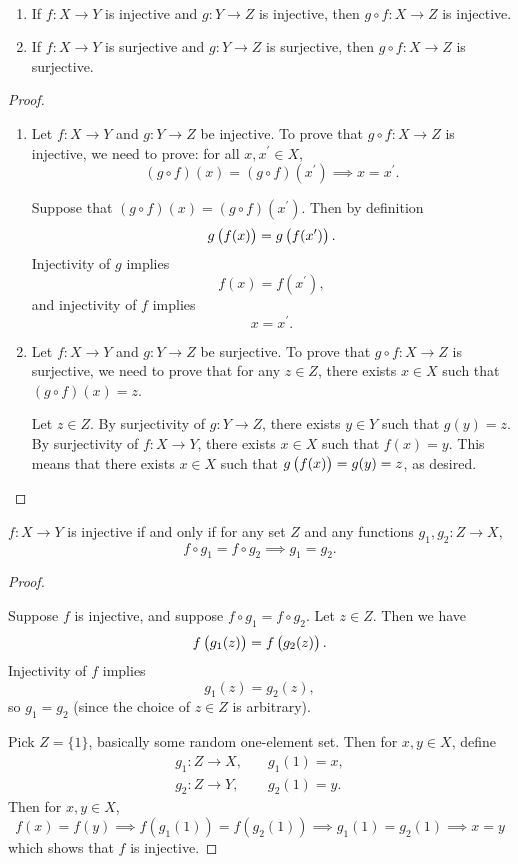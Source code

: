 \begin{proposition} \
\begin{enumerate}[label=(\roman*)]
\item If $f:X \to Y$ is injective and $g:Y \to Z$ is injective, then $g \circ f:X \to Z$ is injective.
\item If $f:X\to Y$ is surjective and $g:Y\to Z$ is surjective, then $g \circ f:X\to Z$ is surjective.
\end{enumerate}
\end{proposition}

\begin{proof} \
\begin{enumerate}[label=(\roman*)]
\item Let $f:X \to Y$ and $g:Y \to Z$ be injective. To prove that $g \circ f:X\to Z$ is injective, we need to prove: for all $x,x^\prime\in X$, 
\[(g \circ f)(x)=(g\circ f)(x^\prime) \implies x=x^\prime.\]

Suppose that $(g \circ f)(x) = (g \circ f)(x^\prime)$. Then by definition
\[g\left(f(x)\right)=g\left(f(x^\prime)\right).\]
Injectivity of $g$ implies
\[f(x)=f(x^\prime),\]
and injectivity of $f$ implies
\[x=x^\prime.\]

\item Let $f:X\to Y$ and $g:Y\to Z$ be surjective. To prove that $g\circ f:X\to Z$ is surjective, we need to prove that for any $z\in Z$, there exists $x\in X$ such that $(g\circ f)(x)=z$.

Let $z\in Z$. By surjectivity of $g:Y\to Z$, there exists $y\in Y$ such that $g(y)=z$. By surjectivity of $f:X\to Y$, there exists $x\in X$ such that $f(x)=y$. This means that there exists $x\in X$ such that $g\left(f(x)\right)=g(y)=z$, as desired.
\end{enumerate}
\end{proof}

\begin{proposition}
$f:X\to Y$ is injective if and only if for any set $Z$ and any functions $g_1,g_2:Z\to X$,
\[f\circ g_1=f\circ g_2 \implies g_1=g_2.\]
\end{proposition}

\begin{proof} \

\fbox{$\implies$} Suppose $f$ is injective, and suppose $f\circ g_1=f\circ g_2$. Let $z\in Z$. Then we have
\[f\left(g_1(z)\right)=f\left(g_2(z)\right).\]
Injectivity of $f$ implies
\[g_1(z)=g_2(z),\]
so $g_1=g_2$ (since the choice of $z\in Z$ is arbitrary).

\fbox{$\impliedby$} Pick $Z=\{1\}$, basically some random one-element set. Then for $x,y\in X$, define
\begin{align*}
g_1:Z\to X,&\quad g_1(1)=x,\\
g_2:Z\to Y,&\quad g_2(1)=y.
\end{align*}
Then for $x,y\in X$,
\[ f(x)=f(y) \implies f(g_1(1))=f(g_2(1)) \implies g_1(1)=g_2(1) \implies x=y \]
which shows that $f$ is injective.
\end{proof}

